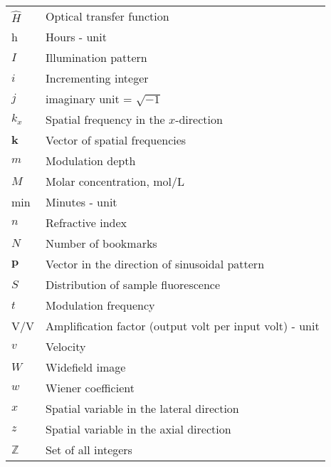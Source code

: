 \begin{flushleft}
\begin{longtable}[l]{|R{5.5em}|p{25em}|}
$\hat{H}$         & Optical transfer function                         \\
h		          & Hours - unit                                      \\
$I$               & Illumination pattern                              \\
$i$               & Incrementing integer                              \\
$j$               & imaginary unit = $\sqrt{-1}$                      \\
$k_x$             & Spatial frequency in the $x$-direction            \\
$\mathbf{k}$      & Vector of spatial frequencies                     \\
$m$               & Modulation depth                                  \\
$M$               & Molar concentration, mol/L                        \\
min		          & Minutes - unit                                    \\
$n$               & Refractive index                                  \\
$N$               & Number of bookmarks                               \\
$\mathbf{p}$      & Vector in the direction of sinusoidal pattern     \\
$S$               & Distribution of sample fluorescence               \\
$t$               & Modulation frequency                              \\
V/V 		      & Amplification factor (output volt per input volt) - unit \\
$v$               & Velocity                                          \\
$W$               & Widefield image                                   \\
$w$               & Wiener coefficient                                \\
$x$               & Spatial variable in the lateral direction         \\
$z$               & Spatial variable in the axial direction           \\
$\mathbb{Z}$      & Set of all integers                               \\
\hline
\end{longtable}
\end{flushleft}
